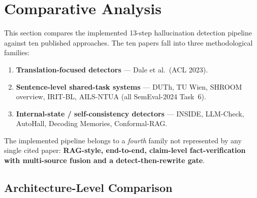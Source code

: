 
\section{Comparative Analysis}
\label{sec:comparative-analysis}

This section compares the implemented 13-step hallucination detection pipeline
against ten published approaches. The ten papers fall into three methodological
families:

\begin{enumerate}
    \item \textbf{Translation-focused detectors} --- Dale et al.\ (ACL 2023).
    \item \textbf{Sentence-level shared-task systems} --- DUTh, TU Wien,
          SHROOM overview, IRIT-BL, AILS-NTUA (all SemEval-2024 Task~6).
    \item \textbf{Internal-state / self-consistency detectors} --- INSIDE,
          LLM-Check, AutoHall, Decoding Memories, Conformal-RAG.
\end{enumerate}

The implemented pipeline belongs to a \emph{fourth} family not represented by
any single cited paper: \textbf{RAG-style, end-to-end, claim-level
fact-verification with multi-source fusion and a detect-then-rewrite gate}.

\subsection{Architecture-Level Comparison}
\label{sec:arch-comparison}

